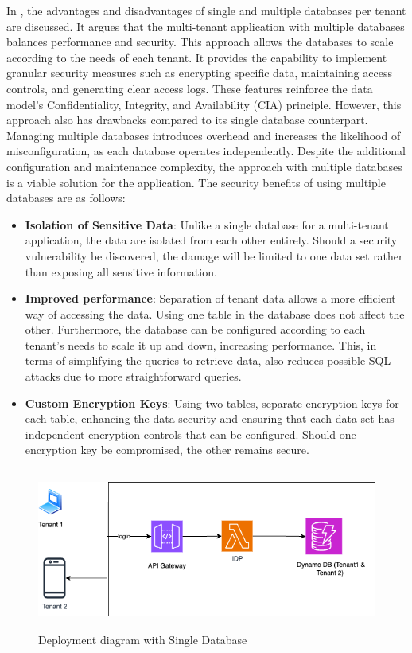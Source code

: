 In \cite{niemela2023implementing}, the advantages and disadvantages of single and multiple databases per tenant are discussed. It argues that the multi-tenant application with multiple databases balances performance and security. This approach allows the databases to scale according to the needs of each tenant. It provides the capability to implement granular security measures such as encrypting specific data, maintaining access controls, and generating clear access logs. These features reinforce the data model's Confidentiality, Integrity, and Availability (CIA) principle. However, this approach also has drawbacks compared to its single database counterpart. Managing multiple databases introduces overhead and increases the likelihood of misconfiguration, as each database operates independently. Despite the additional configuration and maintenance complexity, the approach with multiple databases is a viable solution for the application. The security benefits of using multiple databases are as follows:

\begin{itemize}
    \item \textbf{Isolation of Sensitive Data}: Unlike a single database for a multi-tenant application, the data are isolated from each other entirely. Should a security vulnerability be discovered, the damage will be limited to one data set rather than exposing all sensitive information. 
    
    \item \textbf{Improved performance}: Separation of tenant data allows a more efficient way of accessing the data. Using one table in the database does not affect the other. Furthermore, the database can be configured according to each tenant's needs to scale it up and down, increasing performance. This, in terms of simplifying the queries to retrieve data, also reduces possible SQL attacks due to more straightforward queries.
    
    \item \textbf{Custom Encryption Keys}: Using two tables, separate encryption keys for each table, enhancing the data security and ensuring that each data set has independent encryption controls that can be configured. Should one encryption key be compromised, the other remains secure. 
 
\end{itemize}

\begin{figure}[h!]
\label{fig:deployment_diagram_single}
\centering
\includegraphics[width=\textwidth, height=200px]{pics/deployment_diagram_single.png}
\caption{Deployment diagram with Single Database}
\end{figure}

